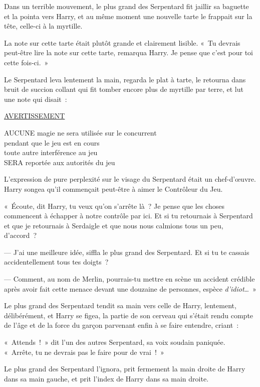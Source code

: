 Dans un terrible mouvement, le plus grand des Serpentard fit jaillir sa baguette et la pointa vers Harry, et au même moment une nouvelle tarte le frappait sur la tête, celle-ci à la myrtille.

La note sur cette tarte était plutôt grande et clairement lisible. «~Tu devrais peut-être lire la note sur cette tarte, remarqua Harry. Je pense que c'est pour toi cette fois-ci.~»

Le Serpentard leva lentement la main, regarda le plat à tarte, le retourna dans bruit de succion collant qui fit tomber encore plus de myrtille par terre, et lut une note qui disait~:

\begin{writtenNote}\centering
\textsc{\underline{AVERTISSEMENT}}

\MakeUppercase{Aucune} magie ne sera utilisée sur le concurrent\\
pendant que le jeu est en cours\\
toute autre interférence au jeu\\
\MakeUppercase{sera} reportée aux autorités du jeu
\end{writtenNote}

L'expression de pure perplexité sur le visage du Serpentard était un chef-d'œuvre. Harry songea qu'il commençait peut-être à aimer le Contrôleur du Jeu.

«~Écoute, dit Harry, tu veux qu'on s'arrête là~? Je pense que les choses commencent à échapper à notre contrôle par ici. Et si tu retournais à Serpentard et que je retournais à Serdaigle et que nous nous calmions tous un peu, d'accord~?

--- J'ai une meilleure idée, siffla le plus grand des Serpentard. Et si tu te cassais accidentellement tous tes doigts~?

--- Comment, au nom de Merlin, pourrais-tu mettre en scène un accident crédible après avoir fait cette menace devant une douzaine de personnes, espèce \emph{d'idiot}…~»

Le plus grand des Serpentard tendit sa main vers celle de Harry, lentement, délibérément, et Harry se figea, la partie de son cerveau qui s'était rendu compte de l'âge et de la force du garçon parvenant enfin à se faire entendre, criant~: 

«~Attends~!~» dit l'un des autres Serpentard, sa voix soudain paniquée. «~Arrête, tu ne devrais pas le faire pour de vrai~!~»

Le plus grand des Serpentard l'ignora, prit fermement la main droite de Harry dans sa main gauche, et prit l'index de Harry dans sa main droite.


